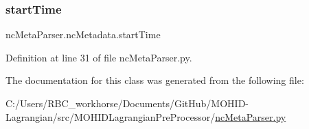 \subsubsection{\texorpdfstring{start\+Time}{startTime}}
{\footnotesize\ttfamily nc\+Meta\+Parser.\+nc\+Metadata.\+start\+Time}



Definition at line 31 of file nc\+Meta\+Parser.\+py.



The documentation for this class was generated from the following file\+:\begin{DoxyCompactItemize}
\item 
C\+:/\+Users/\+R\+B\+C\+\_\+workhorse/\+Documents/\+Git\+Hub/\+M\+O\+H\+I\+D-\/\+Lagrangian/src/\+M\+O\+H\+I\+D\+Lagrangian\+Pre\+Processor/\mbox{\hyperlink{nc_meta_parser_8py}{nc\+Meta\+Parser.\+py}}\end{DoxyCompactItemize}
